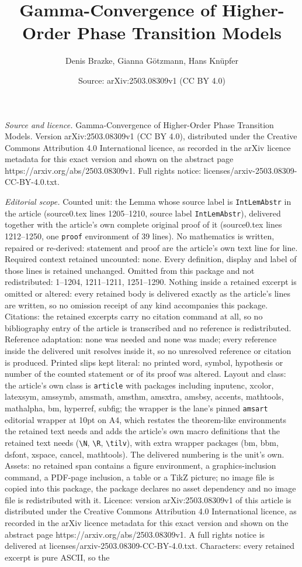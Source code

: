 \documentclass[10pt,a4paper]{amsart}
\title[Gamma-Convergence of Higher-Order Phase Transition Models]{Gamma-Convergence of Higher-Order Phase Transition Models}
\author{Denis Brazke, Gianna G\"otzmann, Hans Kn\"upfer}
\date{Source: arXiv:2503.08309v1 (CC BY 4.0)}
\begin{document}
\maketitle

\noindent\emph{Source and licence.} Gamma-Convergence of Higher-Order Phase Transition Models. Version arXiv:2503.08309v1 (CC BY 4.0), distributed under the Creative Commons Attribution 4.0 International licence, as recorded in the arXiv licence metadata for this exact version and shown on the abstract page https://arxiv.org/abs/2503.08309v1. Full rights notice: licenses/arxiv-2503.08309-CC-BY-4.0.txt.\par\smallskip

\noindent\textit{Editorial scope.} Counted unit: the Lemma whose source label is \texttt{IntLemAbstr} in the article (source0.tex lines 1205--1210, source label \texttt{IntLemAbstr}), delivered together with the article's own complete original proof of it (source0.tex lines 1212--1250, one \texttt{proof} environment of 39 lines). No mathematics is written, repaired or re-derived: statement and proof are the article's own text line for line. Required context retained uncounted: none. Every definition, display and label of those lines is retained unchanged. Omitted from this package and not redistributed: 1--1204, 1211--1211, 1251--1290. Nothing inside a retained excerpt is omitted or altered: every retained body is delivered exactly as the article's lines are written, so no omission receipt of any kind accompanies this package. Citations: the retained excerpts carry no citation command at all, so no bibliography entry of the article is transcribed and no reference is redistributed. Reference adaptation: none was needed and none was made; every reference inside the delivered unit resolves inside it, so no unresolved reference or citation is produced. Printed slips kept literal: no printed word, symbol, hypothesis or number of the counted statement or of its proof was altered. Layout and class: the article's own class is \texttt{article} with packages including inputenc, xcolor, latexsym, amssymb, amsmath, amsthm, amsxtra, amsbsy, accents, mathtools, mathalpha, bm, hyperref, subfig; the wrapper is the lane's pinned \texttt{amsart} editorial wrapper at 10pt on A4, which restates the theorem-like environments the retained text needs and adds the article's own macro definitions that the retained text needs (\texttt{\textbackslash N}, \texttt{\textbackslash R}, \texttt{\textbackslash tilv}), with extra wrapper packages (bm, bbm, dsfont, xspace, cancel, mathtools). The delivered numbering is the unit's own. Assets: no retained span contains a figure environment, a graphics-inclusion command, a PDF-page inclusion, a table or a TikZ picture; no image file is copied into this package, the package declares no asset dependency and no image file is redistributed with it. Licence: version arXiv:2503.08309v1 of this article is distributed under the Creative Commons Attribution 4.0 International licence, as recorded in the arXiv licence metadata for this exact version and shown on the abstract page https://arxiv.org/abs/2503.08309v1. A full rights notice is delivered at licenses/arxiv-2503.08309-CC-BY-4.0.txt. Characters: every retained excerpt is pure ASCII, so the 
\end{document}
